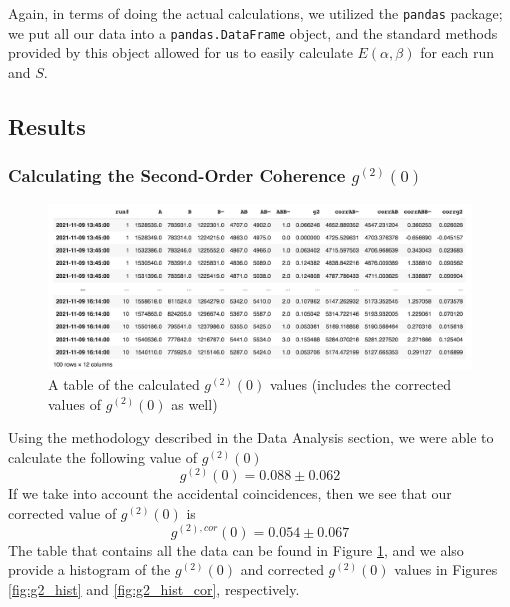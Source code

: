 \documentclass[twocolumn,amsmath,amssymb,pra]{revtex4-2}
\begin{document}
Again, in terms of doing the actual calculations, we utilized the \texttt{pandas} package; we put all our data into a \texttt{pandas.DataFrame} object, and the standard methods provided by this object allowed for us to easily calculate $E(\alpha, \beta)$ for each run and $S$.

\subsection{Results}
\subsubsection{Calculating the Second-Order Coherence $g^{(2)}(0)$}
\begin{figure}[H]
    \centering
    \includegraphics[width = 0.95\linewidth]{g2_table_values.png}
    \caption{A table of the calculated $g^{(2)}(0)$ values (includes the corrected values of $g^{(2)}(0)$ as well)}
    \label{fig:g2_table}
\end{figure}

Using the methodology described in the Data Analysis section, we were able to calculate the following value of $g^{(2)}(0)$
\begin{equation}
    g^{(2)}(0)
    =
    0.088 \pm 0.062
    \label{eq:calculated_g2}
\end{equation}
If we take into account the accidental coincidences, then we see that our corrected value of $g^{(2)}(0)$ is 
\begin{equation}
    g^{(2), cor}(0)
    =
    0.054 \pm 0.067
    \label{eq:calculated_g2_cor}
\end{equation}
The table that contains all the data can be found in Figure \ref{fig:g2_table}, and we also provide a histogram of the $g^{(2)}(0)$ and corrected $g^{(2)}(0)$ values in Figures \ref{fig:g2_hist} and \ref{fig:g2_hist_cor}, respectively.
\end{document}
